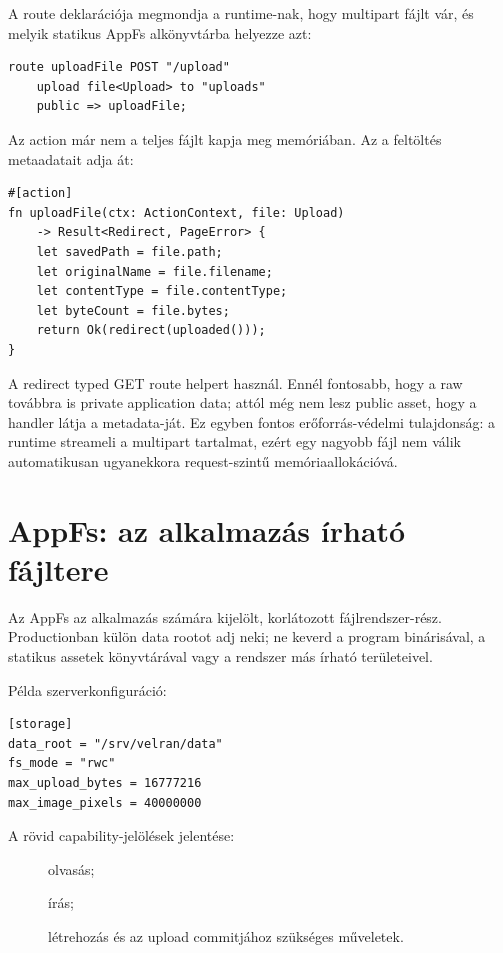 A route deklarációja megmondja a runtime-nak, hogy multipart fájlt vár, és melyik statikus AppFs alkönyvtárba helyezze azt:

\begin{lstlisting}[language=Velran]
route uploadFile POST "/upload"
    upload file<Upload> to "uploads"
    public => uploadFile;
\end{lstlisting}

\newpage
Az action már nem a teljes fájlt kapja meg memóriában. Az  a feltöltés metaadatait adja át:

\begin{lstlisting}[language=Velran]
#[action]
fn uploadFile(ctx: ActionContext, file: Upload)
    -> Result<Redirect, PageError> {
    let savedPath = file.path;
    let originalName = file.filename;
    let contentType = file.contentType;
    let byteCount = file.bytes;
    return Ok(redirect(uploaded()));
}
\end{lstlisting}

A redirect typed  GET route helpert használ. Ennél fontosabb, hogy a raw  továbbra is private application data; attól még nem lesz public asset, hogy a handler látja a metadata-ját. Ez egyben fontos erőforrás-védelmi tulajdonság: a runtime streameli a multipart tartalmat, ezért egy nagyobb fájl nem válik automatikusan ugyanekkora request-szintű memóriaallokációvá.

\section{AppFs: az alkalmazás írható fájltere}

Az AppFs az alkalmazás számára kijelölt, korlátozott fájlrendszer-rész. Productionban külön data rootot adj neki; ne keverd a program binárisával, a statikus assetek könyvtárával vagy a rendszer más írható területeivel.

Példa szerverkonfiguráció:

\begin{lstlisting}
[storage]
data_root = "/srv/velran/data"
fs_mode = "rwc"
max_upload_bytes = 16777216
max_image_pixels = 40000000
\end{lstlisting}

A rövid capability-jelölések jelentése:

\begin{description}
  \item[] olvasás;
  \item[] írás;
  \item[] létrehozás és az upload commitjához szükséges műveletek.
\end{description}


